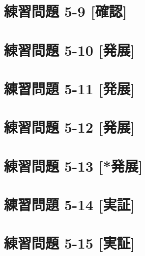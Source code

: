 \documentclass[
]{book}
\begin{document}
\hypertarget{ux7df4ux7fd2ux554fux984c-5-9-ux78baux8a8d}{%
\section*{練習問題 5-9 {[}確認{]}}\label{ux7df4ux7fd2ux554fux984c-5-9-ux78baux8a8d}}

\hypertarget{ux7df4ux7fd2ux554fux984c-5-10-ux767aux5c55}{%
\section*{練習問題 5-10 {[}発展{]}}\label{ux7df4ux7fd2ux554fux984c-5-10-ux767aux5c55}}

\hypertarget{ux7df4ux7fd2ux554fux984c-5-11-ux767aux5c55}{%
\section*{練習問題 5-11 {[}発展{]}}\label{ux7df4ux7fd2ux554fux984c-5-11-ux767aux5c55}}

\hypertarget{ux7df4ux7fd2ux554fux984c-5-12-ux767aux5c55}{%
\section*{練習問題 5-12 {[}発展{]}}\label{ux7df4ux7fd2ux554fux984c-5-12-ux767aux5c55}}

\hypertarget{ux7df4ux7fd2ux554fux984c-5-13-ux767aux5c55}{%
\section*{練習問題 5-13 {[}*発展{]}}\label{ux7df4ux7fd2ux554fux984c-5-13-ux767aux5c55}}

\hypertarget{ux7df4ux7fd2ux554fux984c-5-14-ux5b9fux8a3c}{%
\section*{練習問題 5-14 {[}実証{]}}\label{ux7df4ux7fd2ux554fux984c-5-14-ux5b9fux8a3c}}

\hypertarget{ux7df4ux7fd2ux554fux984c-5-15-ux5b9fux8a3c}{%
\section*{練習問題 5-15 {[}実証{]}}\label{ux7df4ux7fd2ux554fux984c-5-15-ux5b9fux8a3c}}
\end{document}
